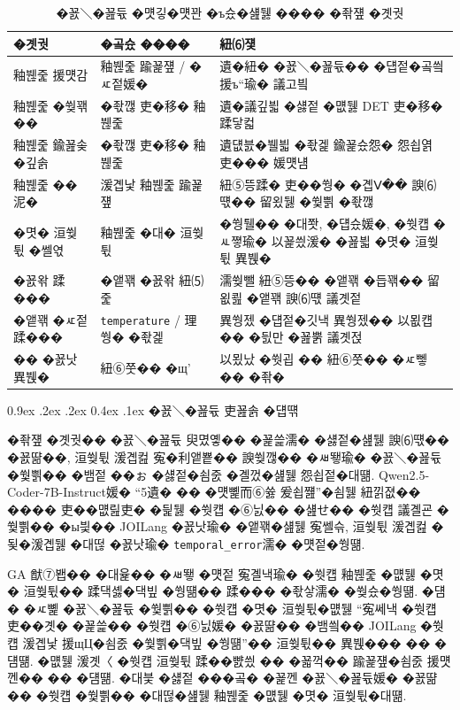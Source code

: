 \documentclass[10pt,twocolumn]{article}
\makeatletter
\renewcommand{\subsection}{\@startsection{subsection}{2}{\z@}%
{0.9ex \@plus .2ex \@minus .2ex}%
{0.4ex \@plus .1ex}%
{\normalfont\normalsize\bfseries}}
\makeatother
\begin{document}
\begin{table}[t]
\centering
\caption{�꾨＼�꾪듃 �먯깋�먯꽌 �ъ슜�섎뒗 ���� �좎쟾 �곗궛}
\label{tab:genetic_operations}
\footnotesize
\renewcommand{\arraystretch}{1.10}
\begin{tabularx}{\columnwidth}{@{}p{}p{}X@{}}
\toprule
\textbf{�곗궛} & \textbf{�곸슜 ����} & \textbf{紐⑹쟻} \\
\midrule
釉붾줉 援먯감 & 釉붾줉 踰꾩쟾 / �ㅼ젙媛� & 遺�紐� �꾨＼�꾪듃�� �덉젙�곸씤 援ъ“瑜� 議고빀 \\
釉붾줉 �쒖꽦�� & �좏깮 吏�移� 釉붾줉 & 遺�議깊븳 �섏젙 �먮뒗 DET 吏�移� 蹂닿컯 \\
釉붾줉 鍮꾪솢�깊솕 & �좏깮 吏�移� 釉붾줉 & 遺덊븘�뷀븳 �좏겙 鍮꾩슜怨� 怨쇱엵 吏��� 媛먯냼 \\
釉붾줉 ��泥� & 湲곕낯 釉붾줉 踰꾩쟾 & 紐⑤뜽蹂� 吏��쒕� �곕Ⅴ�� 諛⑹떇�� 留욌뒗 �쒗쁽 �좏깮 \\
�몃� 洹쒖튃 �쎌엯 & 釉붾줉 �대� 洹쒖튃 & �쒕퉬�� �대쫫, �덉슜媛�, �쒓컙 �ㅻ쪟瑜� 以꾩씠湲� �꾪븳 �몃� 洹쒖튃 異붽� \\
�꾨왂 蹂��� & �앹꽦 �꾨왂 紐⑸줉 & 濡쒖뺄 紐⑤뜽�� �앹꽦 �듭꽦�� 留욊쾶 �앹꽦 諛⑹떇 議곗젙 \\
�앹꽦 �ㅼ젙 蹂��� & \texttt{temperature} / 理쒕� �좏겙 & 異쒕젰 �덉젙�깃낵 異쒕젰�� 以묎컙�� �딄만 �꾪뿕 議곗젅 \\
�� �꾨낫 異붽� & 紐⑥쭛�� �щ’ & 以묐났 �쒓굅 �� 紐⑥쭛�� �ㅼ뼇�� �좎� \\
\bottomrule
\end{tabularx}
\end{table}

\subsection{�꾨＼�꾪듃 吏꾪솕 �덉떆}

�좎쟾 �곗궛�� �꾨＼�꾪듃 臾몄옣�� �꾩쓽濡� �섏젙�섎뒗 諛⑹떇�� �꾨땲��, 洹쒖튃 湲곕컲 寃�利앹뿉�� 諛쒖깮�� �ㅽ뙣瑜� �꾨＼�꾪듃 �쒗쁽�� �뱀젙 ��ぉ �섏젙�쇰줈 �곌껐�섎뒗 怨쇱젙�대떎. Qwen2.5-Coder-7B-Instruct媛� ``5遺� �� �먯뼱而⑥쓣 爰쇱쨾''�쇰뒗 紐낅졊�� ���� 吏��먮릺吏� �딅뒗 �쒓컙 �⑥닔�� �섎せ�� �쒓컙 議곌굔 �쒗쁽�� �ы븿�� JOILang �꾨낫瑜� �앹꽦�섎뒗 寃쎌슦, 洹쒖튃 湲곕컲 �됯�湲곕뒗 �대떦 �꾨낫瑜� \texttt{temporal\_error}濡� �먯젙�쒕떎.

GA 猷⑦봽�� �대윭�� �ㅽ뙣 �먯젙 寃곌낵瑜� �쒓컙 釉붾줉 �먮뒗 �몃� 洹쒖튃�� 蹂댁셿�댁빞 �쒕떎�� 蹂��� �좏샇濡� �쒖슜�쒕떎. �덈� �ㅼ뼱 �꾨＼�꾪듃 �쒗쁽�� �쒓컙 �몃� 洹쒖튃�먮뒗 ``寃쎄낵 �쒓컙 吏��곗� �꾩쓽�� �쒓컙 �⑥닔媛� �꾨땲�� �뱀씤�� JOILang �쒓컙 湲곕낯 援щЦ�쇰줈 �쒗쁽�댁빞 �쒕떎''�� 洹쒖튃�� 異붽��� �� �덈떎. �먮뒗 湲곗〈 �쒓컙 洹쒖튃 蹂��뺤씠 �� �꾧꺽�� 踰꾩쟾�쇰줈 援먯껜�� �� �덈떎. �대븣 �섏젙 ���곸� �꾩껜 �꾨＼�꾪듃媛� �꾨땲�� �쒓컙 �쒗쁽�� �대떦�섎뒗 釉붾줉 �먮뒗 �몃� 洹쒖튃�대떎.
\end{document}
